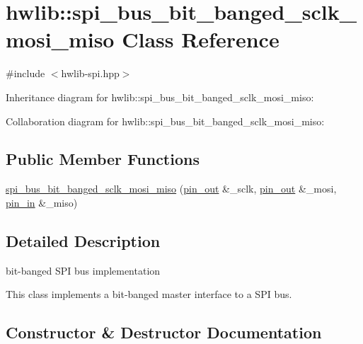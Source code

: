 \hypertarget{classhwlib_1_1spi__bus__bit__banged__sclk__mosi__miso}{}\section{hwlib\+:\+:spi\+\_\+bus\+\_\+bit\+\_\+banged\+\_\+sclk\+\_\+mosi\+\_\+miso Class Reference}
\label{classhwlib_1_1spi__bus__bit__banged__sclk__mosi__miso}


{\ttfamily \#include $<$hwlib-\/spi.\+hpp$>$}



Inheritance diagram for hwlib\+:\+:spi\+\_\+bus\+\_\+bit\+\_\+banged\+\_\+sclk\+\_\+mosi\+\_\+miso\+:


Collaboration diagram for hwlib\+:\+:spi\+\_\+bus\+\_\+bit\+\_\+banged\+\_\+sclk\+\_\+mosi\+\_\+miso\+:
\subsection*{Public Member Functions}
\begin{DoxyCompactItemize}
\item 
\hyperlink{classhwlib_1_1spi__bus__bit__banged__sclk__mosi__miso_a7536e874c3e0ee32eb43cf6e41985cbf}{spi\+\_\+bus\+\_\+bit\+\_\+banged\+\_\+sclk\+\_\+mosi\+\_\+miso} (\hyperlink{classhwlib_1_1pin__out}{pin\+\_\+out} \&\+\_\+sclk, \hyperlink{classhwlib_1_1pin__out}{pin\+\_\+out} \&\+\_\+mosi, \hyperlink{classhwlib_1_1pin__in}{pin\+\_\+in} \&\+\_\+miso)
\end{DoxyCompactItemize}


\subsection{Detailed Description}
bit-\/banged S\+PI bus implementation

This class implements a bit-\/banged master interface to a S\+PI bus. 

\subsection{Constructor \& Destructor Documentation}
\mbox{\label{classhwlib_1_1spi__bus__bit__banged__sclk__mosi__miso_a7536e874c3e0ee32eb43cf6e41985cbf}} 
